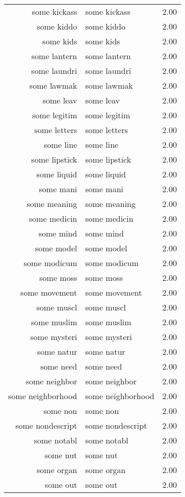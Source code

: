 \begin{table}[ht]
\begin{tabular}{rlr}
  some kickass & some kickass & 2.00 \\ 
  some kiddo & some kiddo & 2.00 \\ 
  some kids & some kids & 2.00 \\ 
  some lantern & some lantern & 2.00 \\ 
  some laundri & some laundri & 2.00 \\ 
  some lawmak & some lawmak & 2.00 \\ 
  some leav & some leav & 2.00 \\ 
  some legitim & some legitim & 2.00 \\ 
  some letters & some letters & 2.00 \\ 
  some line & some line & 2.00 \\ 
  some lipstick & some lipstick & 2.00 \\ 
  some liquid & some liquid & 2.00 \\ 
  some mani & some mani & 2.00 \\ 
  some meaning & some meaning & 2.00 \\ 
  some medicin & some medicin & 2.00 \\ 
  some mind & some mind & 2.00 \\ 
  some model & some model & 2.00 \\ 
  some modicum & some modicum & 2.00 \\ 
  some moss & some moss & 2.00 \\ 
  some movement & some movement & 2.00 \\ 
  some muscl & some muscl & 2.00 \\ 
  some muslim & some muslim & 2.00 \\ 
  some mysteri & some mysteri & 2.00 \\ 
  some natur & some natur & 2.00 \\ 
  some need & some need & 2.00 \\ 
  some neighbor & some neighbor & 2.00 \\ 
  some neighborhood & some neighborhood & 2.00 \\ 
  some non & some non & 2.00 \\ 
  some nondescript & some nondescript & 2.00 \\ 
  some notabl & some notabl & 2.00 \\ 
  some nut & some nut & 2.00 \\ 
  some organ & some organ & 2.00 \\ 
  some out & some out & 2.00 \\ 

\end{tabular}
\end{table}
